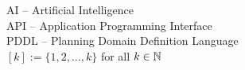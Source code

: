 AI -- Artificial Intelligence\\
API -- Application Programming Interface\\
PDDL -- Planning Domain Definition Language\\
$[k] := \{1, 2, \ldots, k\}$ for all $k \in \mathbb{N}$\\
